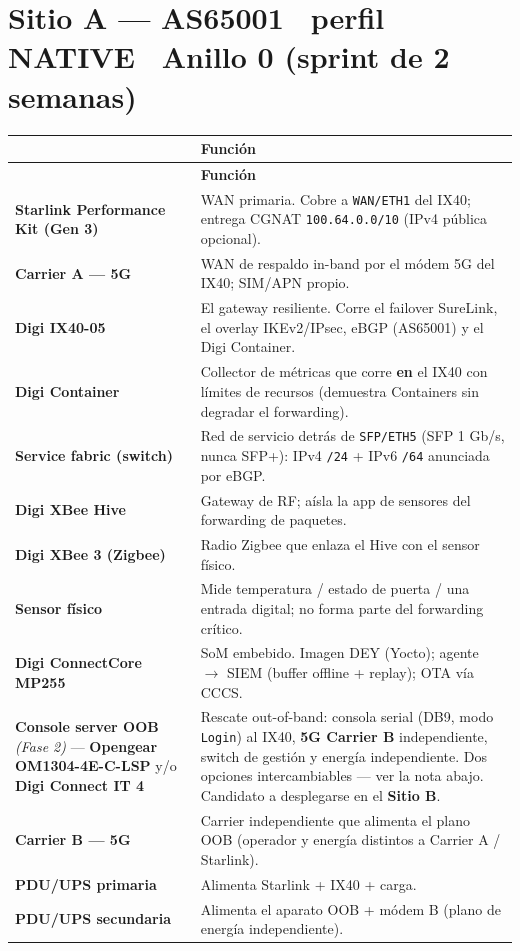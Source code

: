 \documentclass[10pt,letterpaper]{article}
\makeatletter
\newcommand{\kf}[1]{\textbf{\textcolor{PrimaryBlue}{#1}}}
\newcommand{\dtophead}{%
  \rowcolor{PrimaryBlue}{\color{white}\bfseries Aparato} & {\color{white}\bfseries Funci\'on}\\}
\newenvironment{devtable}{%
  \setlength{\arrayrulewidth}{0.4pt}\arrayrulecolor{black!15}%
  \renewcommand{\arraystretch}{1.28}%
  \begin{longtable}{@{}>{\raggedright\arraybackslash}p{4.4cm}@{\hspace{9pt}}>{\raggedright\arraybackslash}p{11.9cm}@{}}
  \dtophead \hline \endfirsthead \dtophead \hline \endhead}
  {\end{longtable}}
\makeatother
\begin{document}
\section{Sitio A --- AS65001 \textbullet\ perfil NATIVE \textbullet\ Anillo 0 (sprint de 2 semanas)}
\begin{devtable}
\textbf{Starlink Performance Kit (Gen 3)} & WAN primaria. Cobre a \texttt{WAN/ETH1} del IX40; entrega CGNAT \texttt{100.64.0.0/10} (IPv4 p\'ublica opcional). \\ \hline
\textbf{Carrier A --- 5G} & WAN de respaldo in-band por el m\'odem 5G del IX40; SIM/APN propio. \\ \hline
\textbf{Digi IX40-05} & El gateway resiliente. Corre el failover SureLink, el overlay IKEv2/IPsec, eBGP (AS65001) y el Digi Container. \\ \hline
\textbf{Digi Container} & Collector de m\'etricas que corre \textbf{en} el IX40 con l\'imites de recursos (demuestra Containers sin degradar el forwarding). \\ \hline
\textbf{Service fabric (switch)} & Red de servicio detr\'as de \texttt{SFP/ETH5} (SFP 1 Gb/s, nunca SFP+): IPv4 \texttt{/24} + IPv6 \texttt{/64} anunciada por eBGP. \\ \hline
\textbf{Digi XBee Hive} & Gateway de RF; a\'isla la app de sensores del forwarding de paquetes. \\ \hline
\textbf{Digi XBee 3 (Zigbee)} & Radio Zigbee que enlaza el Hive con el sensor f\'isico. \\ \hline
\textbf{Sensor f\'isico} & Mide temperatura / estado de puerta / una entrada digital; no forma parte del forwarding cr\'itico. \\ \hline
\textbf{Digi ConnectCore MP255} & SoM embebido. Imagen DEY (Yocto); agente $\rightarrow$ SIEM (buffer offline + replay); OTA v\'ia CCCS. \\ \hline
\textbf{Console server OOB} \textit{(Fase 2)} --- \textbf{Opengear OM1304-4E-C-LSP} y/o \textbf{Digi Connect IT 4} & Rescate out-of-band: consola serial (DB9, modo \texttt{Login}) al IX40, \kf{5G Carrier B} independiente, switch de gesti\'on y energ\'ia independiente. Dos opciones intercambiables --- ver la nota abajo. Candidato a desplegarse en el \kf{Sitio B}. \\ \hline
\textbf{Carrier B --- 5G} & Carrier independiente que alimenta el plano OOB (operador y energ\'ia distintos a Carrier A / Starlink). \\ \hline
\textbf{PDU/UPS primaria} & Alimenta Starlink + IX40 + carga. \\ \hline
\textbf{PDU/UPS secundaria} & Alimenta el aparato OOB + m\'odem B (plano de energ\'ia independiente). \\
\end{devtable}
\end{document}
